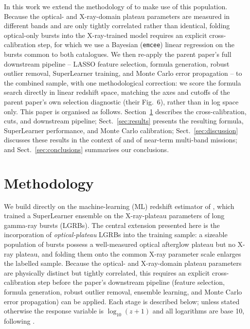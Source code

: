 \documentclass{aa}
\newcommand{\logz}{\log_{10}(z+1)}
\begin{document}
In this work we extend the methodology of \citet{narendra2025} to make use of
this population. Because the optical- and X-ray-domain plateau parameters are
measured in different bands and are only tightly correlated rather than
identical, folding optical-only bursts into the X-ray-trained model requires
an explicit cross-calibration step, for which we use a Bayesian
(\texttt{emcee}) linear regression on the bursts common to both catalogues.
We then re-apply the parent paper's full downstream pipeline -- LASSO feature
selection, formula generation, robust outlier removal, SuperLearner training,
and Monte Carlo error propagation -- to the combined sample, with one
methodological correction: we score the formula search directly in linear
redshift space, matching the axes and cutoffs of the parent paper's own
selection diagnostic (their Fig.~6), rather than in log space only. This
paper is organised as follows. Section~\ref{sec:methodology} describes the
cross-calibration, cuts, and downstream pipeline; Sect.~\ref{sec:results}
presents the resulting formula, SuperLearner performance, and Monte Carlo
calibration; Sect.~\ref{sec:discussion} discusses these results in the
context of \citet{narendra2025} and of near-term multi-band missions; and
Sect.~\ref{sec:conclusions} summarises our conclusions.

\section{Methodology}
\label{sec:methodology}

We build directly on the machine-learning (ML) redshift estimator of
\citet{narendra2025}, which trained a SuperLearner ensemble on the X-ray-plateau
parameters of long gamma-ray bursts (LGRBs). The central extension presented here
is the incorporation of \emph{optical-plateau} LGRBs into the training sample: a
sizeable population of bursts possess a well-measured optical afterglow plateau but
no X-ray plateau, and folding them onto the common X-ray parameter scale enlarges
the labelled sample. Because the optical- and X-ray-domain plateau parameters are
physically distinct but tightly correlated, this requires an explicit
cross-calibration step before the paper's downstream pipeline (feature selection,
formula generation, robust outlier removal, ensemble learning, and Monte Carlo
error propagation) can be applied. Each stage is described below; unless stated
otherwise the response variable is $\logz$ and all logarithms are base 10, following
\citet{narendra2025}.
\end{document}
